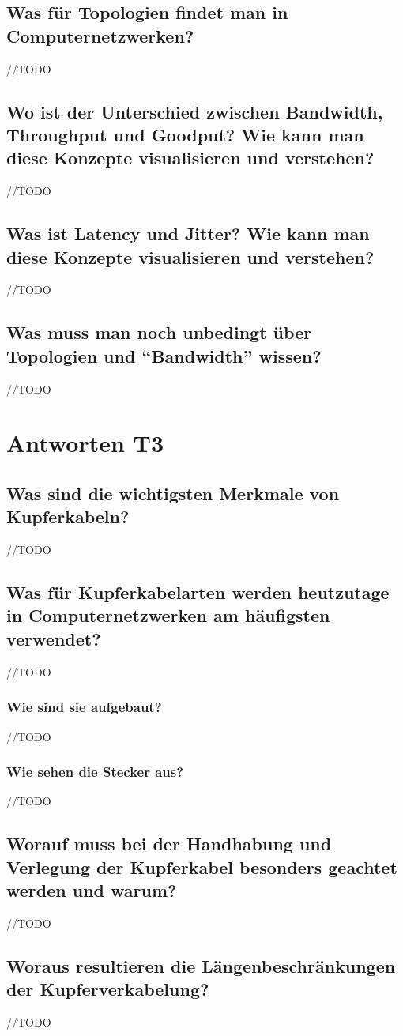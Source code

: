 \subsection*{Was für Topologien findet man in Computernetzwerken?}
//TODO
\subsection*{Wo ist der Unterschied zwischen \flqq{}Bandwidth\frqq, \flqq{}Throughput\frqq{} und \flqq{}Goodput\frqq? Wie kann man diese Konzepte visualisieren und verstehen?}
//TODO
\subsection*{Was ist \flqq{}Latency\frqq{} und \flqq{}Jitter\frqq? Wie kann man diese Konzepte visualisieren und verstehen?}
//TODO
\subsection*{Was muss man noch unbedingt über Topologien und ``Bandwidth'' wissen?}
//TODO

\section{Antworten T3}
\subsection*{Was sind die wichtigsten Merkmale von Kupferkabeln?}
//TODO
\subsection*{Was für Kupferkabelarten werden heutzutage in Computernetzwerken am häufigsten verwendet?}
//TODO
\subsubsection*{Wie sind sie aufgebaut?}
//TODO
\subsubsection*{Wie sehen die Stecker aus?}
//TODO
\subsection*{Worauf muss bei der Handhabung und Verlegung der Kupferkabel besonders geachtet werden und warum?}
//TODO
\subsection*{Woraus resultieren die Längenbeschränkungen der Kupferverkabelung?}
//TODO
